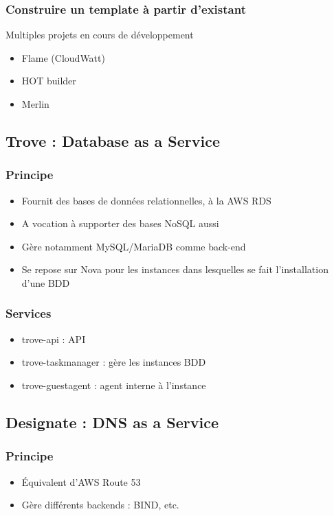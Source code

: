   \begin{frame}
    \frametitle{Construire un template à partir d'existant}
    Multiples projets en cours de développement
    \begin{itemize}
      \item Flame (CloudWatt)
      \item HOT builder
      \item Merlin
    \end{itemize}
  \end{frame}

  \subsection[Trove]{Trove : Database as a Service}

  \begin{frame}
    \frametitle{Principe}
    \begin{itemize}
      \item Fournit des bases de données relationnelles, à la AWS RDS
      \item A vocation à supporter des bases NoSQL aussi
      \item Gère notamment MySQL/MariaDB comme back-end
      \item Se repose sur Nova pour les instances dans lesquelles se fait l'installation d'une BDD
    \end{itemize}
  \end{frame}

  \begin{frame}
    \frametitle{Services}
    \begin{itemize}
      \item trove-api : API
      \item trove-taskmanager : gère les instances BDD
      \item trove-guestagent : agent interne à l'instance
    \end{itemize}
  \end{frame}

  \subsection[Designate]{Designate : DNS as a Service}

  \begin{frame}
    \frametitle{Principe}
    \begin{itemize}
      \item Équivalent d'AWS Route 53
      \item Gère différents backends : BIND, etc.
    \end{itemize}
  \end{frame}

